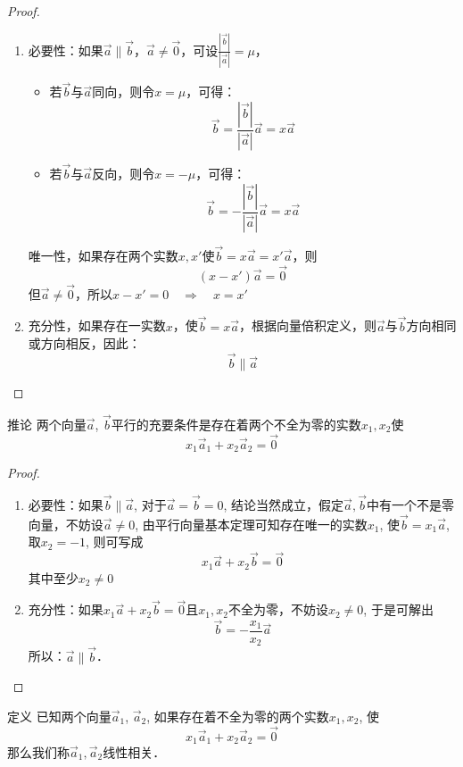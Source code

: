 \begin{proof}
\begin{enumerate}
    \item 必要性：如果$\vec{a}\parallel \vec{b}$，$\vec{a}\ne \vec{0}$，可设$\frac{|\vec{b}|}{|\vec{a}|}=\mu$，
\begin{itemize}
    \item 若$\vec{b}$与$\vec{a}$同向，则令$x=\mu$，可得：
\[\vec{b}=\frac{|\vec{b}|}{|\vec{a}|}\vec{a}=x\vec{a}\]
    \item  若$\vec{b}$与$\vec{a}$反向，则令$x=-\mu$，可得：
\[\vec{b}=-\frac{|\vec{b}|}{|\vec{a}|}\vec{a}=x\vec{a}\]
\end{itemize}

唯一性，如果存在两个实数$x,x'$使$\vec{b}=x\vec{a}=x'\vec{a}$，则
\[(x-x')\vec{a}=\vec{0}\]
但$\vec{a}\ne \vec{0}$，所以$x-x'=0\quad \Rightarrow\quad x=x'$

\item 充分性，如果存在一实数$x$，使$\vec{b}=x\vec{a}$，根据向量倍积定义，则$\vec{a}$与$\vec{b}$方向相同或方向相反，因此：
\[\vec{b}\parallel \vec{a}\]
\end{enumerate}
\end{proof}

\begin{blk}
{推论} 两个向量$\vec{a}$, $\vec{b}$平行的充要条件是存在着两个不全为零的实数$x_1,x_2$使
\[x_1\vec{a}_1+x_2\vec{a}_2=\vec{0}\]
\end{blk}

\begin{proof}
\begin{enumerate}
    \item 必要性：如果$\vec{b}\parallel \vec{a}$, 对于$\vec{a}=\vec{b}=0$, 结论当然成立，假定$\vec{a}, \vec{b}$中有一个不是零向量，不妨设$\vec{a}\ne 0$, 由平行向量基本定理可知存在唯一的实数$x_1$, 使$\vec{b}=x_1\vec{a}$, 取$x_2=-1$, 则可写成
    \[x_1\vec{a}+x_2\vec{b}=\vec{0}\]
其中至少$x_2\ne 0$
\item 充分性：如果$x_1\vec{a}+x_2\vec{b}=\vec{0}$且$x_1,x_2$不全为零，不妨设$x_2\ne 0$, 于是可解出
\[\vec{b}=-\frac{x_1}{x_2}\vec{a}\]
所以：$\vec{a}\parallel \vec{b}$．
\end{enumerate}
\end{proof}

\begin{blk}
    {定义} 已知两个向量$\vec{a}_1$, $\vec{a}_2$, 如果存在着不全为零的两个实数$x_1,x_2$, 使
    \[x_1\vec{a}_1+x_2\vec{a}_2=\vec{0}\]
那么我们称$\vec{a}_1,\vec{a}_2$线性相关．
\end{blk}

